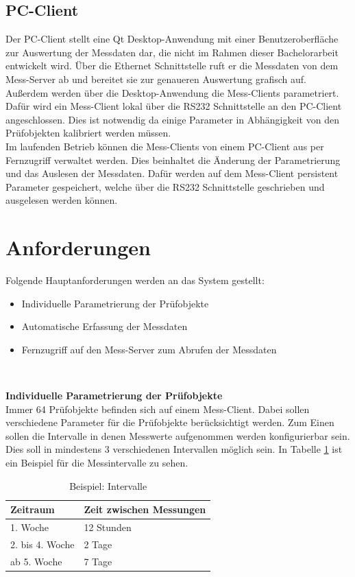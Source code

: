 \subsection{PC-Client}
\label{section_PC-Client}
Der PC-Client stellt eine Qt Desktop-Anwendung mit einer Benutzeroberfläche zur Auswertung der Messdaten dar, die nicht im Rahmen dieser Bachelorarbeit entwickelt wird. Über die Ethernet Schnittstelle ruft er die Messdaten von dem Mess-Server ab und bereitet sie zur genaueren Auswertung grafisch auf.\\
Außerdem werden über die Desktop-Anwendung die Mess-Clients parametriert. Dafür wird ein Mess-Client lokal über die RS232 Schnittstelle an den PC-Client angeschlossen. Dies ist notwendig da einige Parameter in Abhängigkeit von den Prüfobjekten kalibriert werden müssen.\\
Im laufenden Betrieb können die Mess-Clients von einem PC-Client aus per Fernzugriff verwaltet werden. Dies beinhaltet die Änderung der Parametrierung und das Auslesen der Messdaten. Dafür werden auf dem Mess-Client persistent Parameter gespeichert, welche über die RS232 Schnittstelle geschrieben und ausgelesen werden können.



\section{Anforderungen}
Folgende Hauptanforderungen werden an das System gestellt:
\begin{itemize}
\item Individuelle Parametrierung der Prüfobjekte
\item Automatische Erfassung der Messdaten
\item Fernzugriff auf den Mess-Server zum Abrufen der Messdaten
\end{itemize}
\ 

\textbf{Individuelle Parametrierung der Prüfobjekte}\\
Immer 64 Prüfobjekte befinden sich auf einem Mess-Client. Dabei sollen verschiedene Parameter für die Prüfobjekte berücksichtigt werden. 
Zum Einen sollen die Intervalle in denen Messwerte aufgenommen werden konfigurierbar sein. Dies soll in mindestens 3 verschiedenen Intervallen möglich sein. In Tabelle \ref{table_Intervalle} ist ein Beispiel für die Messintervalle zu sehen. 

 
\begin{table}[H]
\begin{center}
\begin{tabular}{|l|l|}\hline
Zeitraum & Zeit zwischen Messungen \\ \hline
1. Woche & 12 Stunden\\ 
2. bis 4. Woche & 2 Tage\\ 
ab 5. Woche & 7 Tage\\ \hline
\end{tabular}
\caption{Beispiel: Intervalle}
\label{table_Intervalle}
\end{center}
\end{table}



